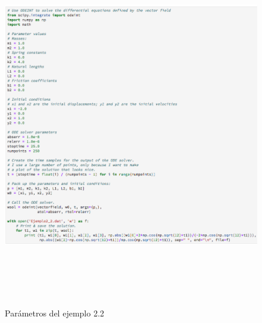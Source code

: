 \begin{figure}
	\begin{center}
        \includegraphics[height=16cm]{Ejem2_2-Para}
        \caption{Parámetros del ejemplo 2.2}
        \label{Ejem2.2-Para}
    \end{center}
\end{figure}
        
